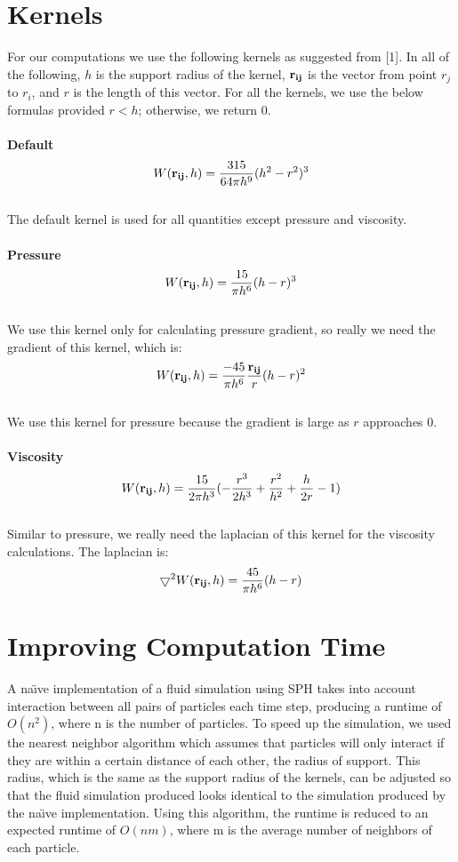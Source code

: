 \documentclass[11pt]{article}
\begin{document}
\section*{Kernels}
For our computations we use the following kernels as suggested from [1]. In all of the following, $h$ is the support radius of the kernel, ${\bf r_{ij}}$ is the vector from point $r_j$ to $r_i$, and $r$ is the length of this vector. For all the kernels, we use the below formulas provided $r<h$; otherwise, we return $0$.\\ \\
{\bf Default}
$$W({\bf r_{ij}},h) = \frac{315}{64\pi h^9}(h^2 - r^2)^3 $$ \\
The default kernel is used for all quantities except pressure and viscosity.
\\
\\
{\bf Pressure}
$$ W({\bf r_{ij}},h) = \frac{15}{\pi h^6}(h-r)^3$$
\\
We use this kernel only for calculating pressure gradient, so really we need the gradient of this kernel, which is:
\\
$$ W({\bf r_{ij}},h) = \frac{-45}{\pi h^6}\frac{{\bf r_{ij}}}{r}(h-r)^2$$
\\
We use this kernel for pressure because the gradient is large as $r$ approaches $0$.
\\
\\
{\bf Viscosity}
$$W({\bf r_{ij}},h) = \frac{15}{2\pi h^3}(-\frac{r^3}{2h^3} + \frac{r^2}{h^2} + \frac{h}{2r} - 1) $$
\\
Similar to pressure, we really need the laplacian of this kernel for the viscosity calculations. The laplacian is:
\\
$$\bigtriangledown^2 W({\bf r_{ij}},h) = \frac{45}{\pi h^6}(h-r) $$


\section*{Improving Computation Time}
A  na\"{\i}ve implementation of a fluid simulation using SPH takes into account interaction between all pairs of particles each time step, producing a runtime of $O(n^2)$, where n is the number of particles. To speed up the simulation, we used the nearest neighbor algorithm which assumes that particles will only interact if they are within a certain distance of each other, the radius of support. This radius, which is the same as the support radius of the kernels, can be adjusted so that the fluid simulation produced looks identical to the simulation produced by the  na\"{\i}ve implementation. Using this algorithm, the runtime is reduced to an expected runtime of $O(nm)$, where m is the average number of neighbors of each particle.
\end{document}
